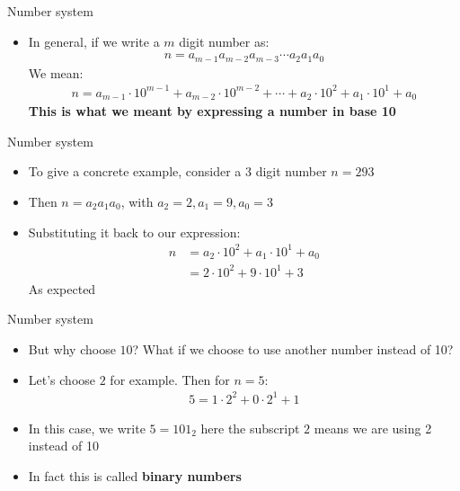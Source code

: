\documentclass[10pt,xcolor={table,dvipsnames},t]{beamer}
\begin{document}
\begin{frame}{Number system}
  \begin{itemize}
    \item In general, if we write a $m$ digit number as:
    \begin{align*}
      n = a_{m-1} a_{m-2} a_{m-3} \cdots a_{2} a_{1} a_{0}
    \end{align*}
    We mean:
    \begin{align*}
      n = a_{m-1} \cdot 10^{m-1} + a_{m-2} \cdot 10^{m-2} + \cdots + a_{2} \cdot 10^2 + a_{1} \cdot 10^{1} + a_{0}
    \end{align*}
    \textbf{This is what we meant by expressing a number in base 10}
  \end{itemize}
\end{frame}

\begin{frame}{Number system}
  \begin{itemize}
    \item To give a concrete example, consider a 3 digit number $n=293$
    \item Then $n=a_2 a_1 a_0$, with $a_2 = 2, a_1 = 9, a_0 = 3$
    \item Substituting it back to our expression:
    \begin{align*}
      n &= a_{2} \cdot 10^{2} + a_{1} \cdot 10^{1} +  a_{0}\\
      &= 2 \cdot 10^{2} + 9 \cdot 10^{1} + 3
    \end{align*}
    As expected
  \end{itemize}
\end{frame}

\begin{frame}{Number system}
  \begin{itemize}
    \item But why choose $10$? What if we choose to use another number instead of 10?
    \item Let's choose $2$ for example. Then for $n=5$:
    \begin{align*}
      5 = 1\cdot 2^2 + 0\cdot 2^1 + 1
    \end{align*}
    \item In this case, we write $5=101_2$ here the subscript $2$ means we are using 2 instead of 10
    \item In fact this is called \textbf{binary numbers}
  \end{itemize}  
\end{frame}
\end{document}
